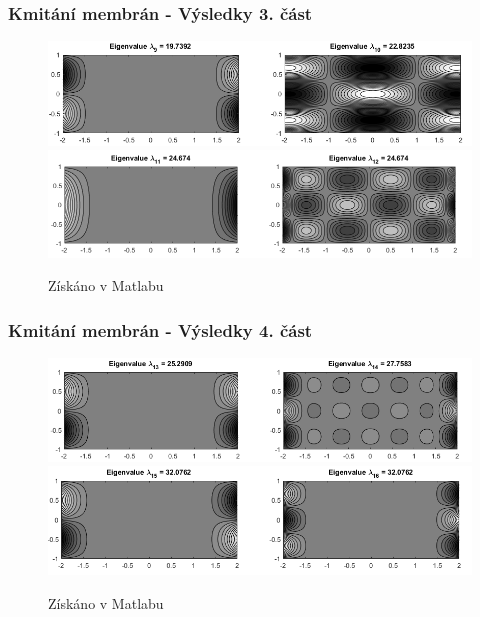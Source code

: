 \documentclass{beamer}
\begin{document}
\begin{frame}
\frametitle{Kmitání membrán - Výsledky 3. část}
\centering
\begin{figure}
\includegraphics[width=1\linewidth]{obdelnicky5.png}
\includegraphics[width=1\linewidth]{obdelnicky6.png}
\caption{Získáno v Matlabu}
\end{figure}
\end{frame}

\begin{frame}
\frametitle{Kmitání membrán - Výsledky 4. část}
\centering
\begin{figure}
\includegraphics[width=1\linewidth]{obdelnicky7.png}
\includegraphics[width=1\linewidth]{obdelnicky8.png}
\caption{Získáno v Matlabu}
\end{figure}
\end{frame}
\end{document}

